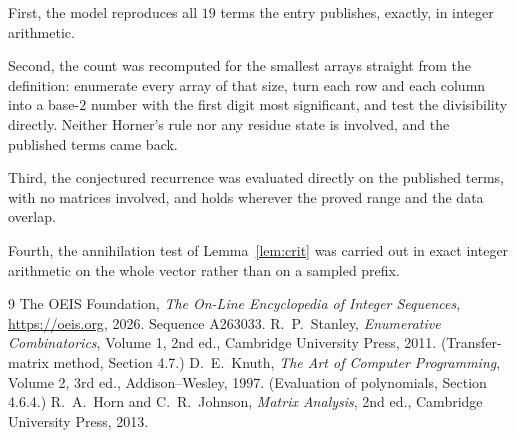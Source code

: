 \documentclass[11pt,a4paper]{article}
\theoremstyle{plain}
\theoremstyle{definition}
\begin{document}
First, the model reproduces all $19$ terms the entry publishes, exactly, in integer
arithmetic.

Second, the count was recomputed for the smallest arrays straight from the definition:
enumerate every array of that size, turn each row and each column into a base-$2$ number with
the first digit most significant, and test the divisibility directly. Neither Horner's rule nor
any residue state is involved, and the published terms came back.

Third, the conjectured recurrence was evaluated directly on the published terms, with no
matrices involved, and holds wherever the proved range and the data overlap.

Fourth, the annihilation test of Lemma~\ref{lem:crit} was carried out in exact integer
arithmetic on the whole vector rather than on a sampled prefix.

\begin{thebibliography}{9}
 The OEIS Foundation, \emph{The On-Line Encyclopedia of Integer
Sequences}, \url{https://oeis.org}, 2026. Sequence A263033.
 R.~P.~Stanley, \emph{Enumerative Combinatorics}, Volume 1, 2nd ed.,
Cambridge University Press, 2011. (Transfer-matrix method, Section 4.7.)
 D.~E.~Knuth, \emph{The Art of Computer Programming}, Volume 2, 3rd ed.,
Addison--Wesley, 1997. (Evaluation of polynomials, Section 4.6.4.)
 R.~A.~Horn and C.~R.~Johnson, \emph{Matrix Analysis}, 2nd ed., Cambridge
University Press, 2013.
\end{thebibliography}
\end{document}
